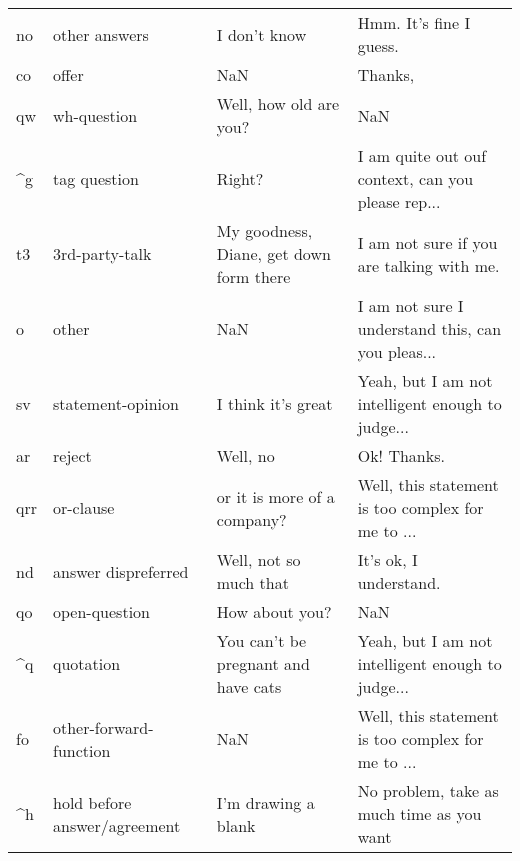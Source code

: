 \begin{tabular}{llll}
no          &                 other answers &                                     I don't know &                            Hmm. It's fine I guess. \\
co          &                         offer &                                              NaN &                                           Thanks,  \\
qw          &                   wh-question &                           Well, how old are you? &                                                NaN \\
\textasciicircum g          &                  tag question &                                           Right? &  I am quite out ouf context, can you please rep... \\
t3          &                3rd-party-talk &          My goodness, Diane, get down form there &          I am not sure if you are talking with me. \\
o           &                         other &                                              NaN &  I am not sure I understand this, can you pleas... \\
sv          &             statement-opinion &                               I think it's great &  Yeah, but I am not intelligent enough to judge... \\
ar          &                        reject &                                         Well, no &                                        Ok! Thanks. \\
qrr         &                     or-clause &                      or it is more of a company? &  Well, this statement is too complex for me to ... \\
nd          &           answer dispreferred &                           Well, not so much that &                             It's ok, I understand. \\
qo          &                 open-question &                                   How about you? &                                                NaN \\
\textasciicircum q          &                     quotation &              You can't be pregnant and have cats &  Yeah, but I am not intelligent enough to judge... \\
fo          &        other-forward-function &                                              NaN &  Well, this statement is too complex for me to ... \\
\textasciicircum h          &  hold before answer/agreement &                              I'm drawing a blank &          No problem, take as much time as you want \\

\end{tabular}
